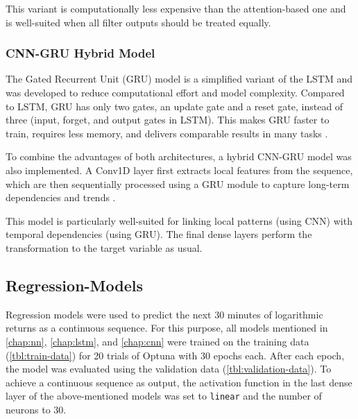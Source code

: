 This variant is computationally less expensive than the attention-based one and is well-suited when all filter outputs should be treated equally.



\subsubsection{CNN-GRU Hybrid Model}

The Gated Recurrent Unit (GRU) model is a simplified variant of the LSTM and was developed to reduce computational effort and model complexity.
Compared to LSTM, GRU has only two gates, an update gate and a reset gate, instead of three (input, forget, and output gates in LSTM).
This makes GRU faster to train, requires less memory, and delivers comparable results in many tasks \cite{gru-basics}.

To combine the advantages of both architectures, a hybrid CNN-GRU model was also implemented.
A Conv1D layer first extracts local features from the sequence, which are then sequentially processed using a GRU module to capture long-term dependencies and trends \cite{cnn-gru}.

This model is particularly well-suited for linking local patterns (using CNN) with temporal dependencies (using GRU).
The final dense layers perform the transformation to the target variable as usual.



\subsection{Regression-Models}
\label{chap:regression-models}

Regression models were used to predict the next 30 minutes of logarithmic returns as a continuous sequence.
For this purpose, all models mentioned in \autoref{chap:nn}, \autoref{chap:lstm}, and \autoref{chap:cnn} were trained on the training data (\autoref{tbl:train-data}) for 20 trials of Optuna with 30 epochs each.
After each epoch, the model was evaluated using the validation data (\autoref{tbl:validation-data}).
To achieve a continuous sequence as output, the activation function in the last dense layer of the above-mentioned models was set to \verb|linear| and the number of neurons to 30.

